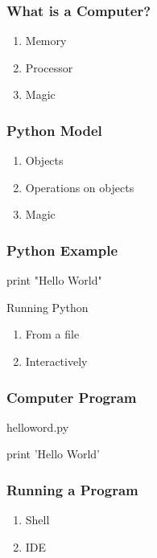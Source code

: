 \begin{frame}[fragile]
\frametitle{What is a Computer?}

\begin{enumerate}
\item Memory
\item Processor
\item Magic
\end{enumerate}
\end{frame}

\begin{frame}[fragile]
\frametitle{Python Model}

\begin{enumerate}
\item Objects
\item Operations on objects
\item Magic
\end{enumerate}
\end{frame}


\begin{frame}[fragile]
\frametitle{Python Example}

\begin{python}
print "Hello World"
\end{python}
\end{frame}


\begin{frame}[fragile]

\begin{block}{Running Python}
\begin{enumerate}
\item From a file
\item Interactively
\end{enumerate}
\end{block}

\end{frame}

\begin{frame}[fragile]
\frametitle{Computer Program}

\begin{block}{helloword.py}
\begin{python}
print 'Hello World'
\end{python}
\end{block}
\end{frame}

\begin{frame}[fragile]
\frametitle{Running a Program}
\begin{enumerate}
\item Shell
\item IDE
\end{enumerate}
\end{frame}

